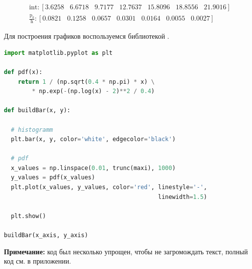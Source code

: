 \documentclass[a4paper, 14pt]{extarticle}
\begin{document}
\vspace{-20pt}

\begin{align*}
  & \text{int}: [ 3.6258 \hspace{10pt} 6.6718  \hspace{10pt} 9.7177 \hspace{10pt} 12.7637 \hspace{10pt} 15.8096 \hspace{10pt} 18.8556 \hspace{10pt} 21.9016] \\
  & \frac{\text{p}_k}{\text{h}}: [0.0821  \hspace{10pt} 0.1258  \hspace{10pt} 0.0657 \hspace{10pt} 0.0301  \hspace{10pt} 0.0164  \hspace{10pt} 0.0055  \hspace{10pt} 0.0027]
\end{align*}

Для построения графиков воспользуемся библиотекой . \\

\begin{center}
  \begin{lstlisting}[language=Python]
import matplotlib.pyplot as plt

def pdf(x):
    return 1 / (np.sqrt(0.4 * np.pi) * x) \
        * np.exp(-(np.log(x) - 2)**2 / 0.4)

def buildBar(x, y):

  # histogramm 
  plt.bar(x, y, color='white', edgecolor='black')

  # pdf
  x_values = np.linspace(0.01, trunc(maxi), 1000)
  y_values = pdf(x_values)
  plt.plot(x_values, y_values, color='red', linestyle='-', 
                                            linewidth=1.5)

  plt.show()

buildBar(x_axis, y_axis)
  \end{lstlisting}
\end{center}

{\footnotesize \textbf{Примечание:} код был несколько упрощен, чтобы не загромождать текст, 
полный код см. в приложении.}
\end{document}
